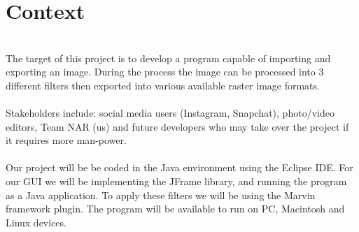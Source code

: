 \documentclass{article}
\begin{document}
\section{Context}
\\
The target of this project is to develop a program capable of importing and exporting an image. During the process the image can be processed into 3 different filters then exported into various available raster image formats. 
\\ \\
\noindent Stakeholders include: social media users (Instagram, Snapchat), photo/video editors, Team NAR (us) and future developers who may take over the project if it requires more man-power.
\\ \\
Our project will be be coded in the Java environment using the Eclipse IDE. For our GUI we will be implementing the JFrame library, and running the program as a Java application. To apply these filters we will be using the Marvin framework plugin. The program will be available to run on PC, Macintosh and Linux devices.
\end{document}
